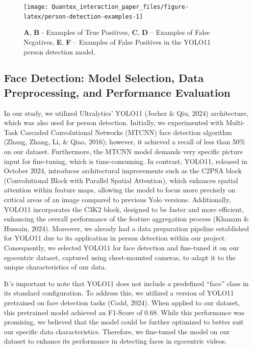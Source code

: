 \documentclass[
  man,floatsintext]{apa6}
\begin{document}
\begin{figure}

{\centering \texttt{[image: Quantex\_interaction\_paper\_files/figure-latex/person-detection-examples-1]} 

}

\caption{\textbf{A}, \textbf{B} - Examples of True Positives, \textbf{C}, \textbf{D} – Examples of False Negatives, \textbf{E}, \textbf{F} – Examples of False Positives in the YOLO11 person detection model.}\label{fig:person-detection-examples}
\end{figure}

\subsection{Face Detection: Model Selection, Data Preprocessing, and Performance Evaluation}\label{face-detection-model-selection-data-preprocessing-and-performance-evaluation}

In our study, we utilized Ultralytics' YOLO11 (Jocher \& Qiu, 2024) architecture, which was also used for person detection. Initially, we experimented with Multi-Task Cascaded Convolutional Networks (MTCNN) face detection algorithm (Zhang, Zhang, Li, \& Qiao, 2016); however, it achieved a recall of less than 50\% on our dataset. Furthermore, the MTCNN model demands very specific picture input for fine-tuning, which is time-consuming. In contrast, YOLO11, released in October 2024, introduces architectural improvements such as the C2PSA block (Convolutional Block with Parallel Spatial Attention), which enhances spatial attention within feature maps, allowing the model to focus more precisely on critical areas of an image compared to previous Yolo versions. Additionally, YOLO11 incorporates the C3K2 block, designed to be faster and more efficient, enhancing the overall performance of the feature aggregation process (Khanam \& Hussain, 2024). Moreover, we already had a data preparation pipeline established for YOLO11 due to its application in person detection within our project. Consequently, we selected YOLO11 for face detection and fine-tuned it on our egocentric dataset, captured using chest-mounted cameras, to adapt it to the unique characteristics of our data.

It's important to note that YOLO11 does not include a predefined ``face'' class in its standard configuration. To address this, we utilized a version of YOLO11 pretrained on face detection tasks (Codd, 2024). When applied to our dataset, this pretrained model achieved an F1-Score of 0.68. While this performance was promising, we believed that the model could be further optimized to better suit our specific data characteristics. Therefore, we fine-tuned the model on our dataset to enhance its performance in detecting faces in egocentric videos.
\end{document}
